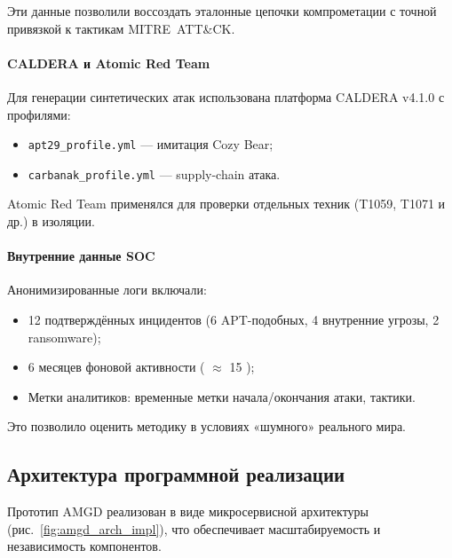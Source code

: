 \documentclass{article}
\begin{document}
Эти данные позволили воссоздать эталонные цепочки компрометации с точной привязкой к тактикам MITRE~ATT\&CK.

\paragraph{CALDERA и Atomic Red Team}
Для генерации синтетических атак использована платформа CALDERA v4.1.0 с профилями:
\begin{itemize}
    \item \texttt{apt29\_profile.yml} — имитация Cozy Bear;
    \item \texttt{carbanak\_profile.yml} — supply-chain атака.
\end{itemize}

Atomic Red Team применялся для проверки отдельных техник (T1059, T1071 и др.) в изоляции.

\paragraph{Внутренние данные SOC}
Анонимизированные логи включали:
\begin{itemize}
    \item 12 подтверждённых инцидентов (6 APT-подобных, 4 внутренние угрозы, 2 ransomware);
    \item 6 месяцев фоновой активности ( $\approx$ 15 );
    \item Метки аналитиков: временные метки начала/окончания атаки, тактики.
\end{itemize}

Это позволило оценить методику в условиях «шумного» реального мира.

\subsection{Архитектура программной реализации}

Прототип AMGD реализован в виде микросервисной архитектуры (рис.~\ref{fig:amgd_arch_impl}), что обеспечивает масштабируемость и независимость компонентов.
\end{document}
